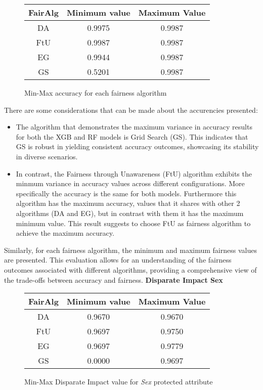 \begin{figure}[H]
    \centering
    \begin{tabular}{|c|c|c|}
        \hline
        \textbf{FairAlg} & \textbf{Minimum value} & \textbf{Maximum Value} \\
        \hline
        DA & 0.9975 & 0.9987 \\
        \hline
        FtU & 0.9987 & 0.9987 \\
        \hline
        EG & 0.9944 & 0.9987 \\
        \hline
        GS & 0.5201 & 0.9987 \\
        \hline
    \end{tabular}
    \caption{Min-Max accuracy for each fairness algorithm}
\end{figure}

There are some considerations that can be made about the accurencies presented:
\begin{itemize}

    \item The algorithm that demonstrates the maximum variance in accuracy results for both the XGB and RF models is Grid Search (GS). This indicates that GS is robust in yielding consistent accuracy outcomes, showcasing its stability in diverse scenarios.

    \item In contrast, the Fairness through Unawareness (FtU) algorithm exhibits the minmum variance in accuracy values across different configurations. More specifically the accuracy is the same for both models. Furthermore this algorithm has the maximum accuracy, values that it shares with other 2 algorithms (DA and EG), but in contrast with them it has the maximum minimum value. This result suggests to choose FtU as fairness algorithm to achieve the maximum accuracy.
\end{itemize}

Similarly, for each fairness algorithm, the minimum and maximum fairness values are presented. This evaluation allows for an understanding of the fairness outcomes associated with different algorithms, providing a comprehensive view of the trade-offs between accuracy and fairness.
\newpage
\textbf{Disparate Impact Sex}
\begin{figure}[H]
    \centering
    \begin{tabular}{|c|c|c|}
        \hline
        \textbf{FairAlg} & \textbf{Minimum value} & \textbf{Maximum Value} \\
        \hline
        DA & 0.9670 & 0.9670 \\
        \hline
        FtU & 0.9697 & 0.9750 \\
        \hline
        EG & 0.9697 & 0.9779 \\
        \hline
        GS & 0.0000 & 0.9697 \\
        \hline
    \end{tabular}
    \caption{Min-Max Disparate Impact value for \emph{Sex} protected attribute}
\end{figure}

